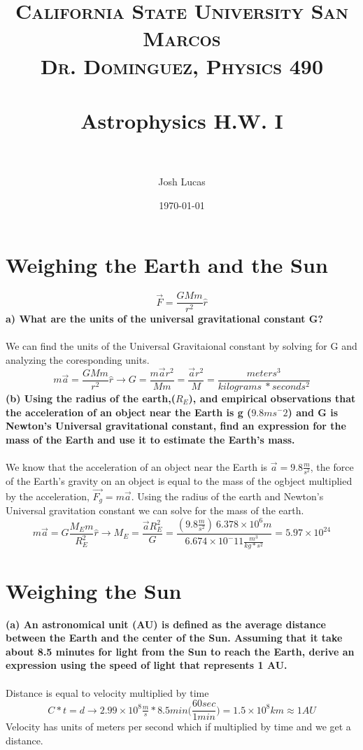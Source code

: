 \documentclass[paper=a4, fontsize=11pt]{scrartcl} %
\title{	
\normalfont \normalsize 
\textsc{California State University San Marcos \\ Dr. Dominguez, Physics 490} \\ [25pt] %
\horrule{0.5pt} \\[0.4cm] %
\huge Astrophysics H.W. I \\ %
\horrule{2pt} \\[0.5cm] %
}
\author{Josh Lucas} %
\date{\normalsize\today} %
\numberwithin{equation}{section} %
\numberwithin{figure}{section} %
\numberwithin{table}{section} %
\begin{document}
\maketitle %


\section{Weighing the Earth and the Sun}
\begin{equation}
\vec{F}= \frac{GMm}{r^2}\hat{r}
\end{equation}
\textbf{a) What are the units of the universal gravitational constant G?}\\
\\
We can find the units of the Universal Gravitaional constant by solving for G and analyzing the coresponding units.
\begin{equation*}
m\vec{a} = \frac{GMm}{r^2}\hat{r} \rightarrow G = \frac{m\vec{a} r^2}{Mm} = \frac{\vec{a}r^2}{M} = \frac{meters^3}{kilograms\ * seconds^2}
\end{equation*}
\textbf{(b) Using the radius of the earth,($R_E$), and empirical observations that the acceleration of an object near the Earth is g ($9.8ms^-2$)  and G is Newton's  Universal gravitational constant, find an expression for the mass of the Earth and use it to estimate the Earth's mass.}\\
\\
We know that the acceleration of an object near the Earth is $\vec{a} = 9.8\tfrac{m}{s^2}$, the force of the Earth's gravity on an object is equal to the mass of the ogbject multiplied by the acceleration,  $ \vec{F_g} = m\vec{a}$. Using the radius of the earth and Newton's Universal gravitation constant we can solve for the mass of the earth.
\begin{equation*}
m\vec{a} = G\frac{M_E m}{R_E^2}\hat{r} \rightarrow M_E = \frac{\vec{a}R_E^2}{G} = \frac{(9.8\tfrac{m}{s^2})\ 6.378\times 10^6m}{6.674\times 10^-11 \tfrac{m^3}{kg*s^2}} = 5.97\times 10^{24}
\end{equation*}
\section{Weighing the Sun}

\textbf{(a) An astronomical unit (AU) is defined as the average distance between the Earth and the
center of the Sun. Assuming that it take about 8.5 minutes for light from the Sun to reach the
Earth, derive an expression using the speed of light that represents 1 AU.}\\
\\
Distance is equal to velocity multiplied by time
\begin{equation*}
C * t = d \rightarrow 2.99\times 10^8 \tfrac{m}{s} * 8.5min \big(\frac{60sec}{1min}\big) = 1.5\times 10^8 km\approx1 AU
\end{equation*}
Velocity has units of meters per second which if multiplied by time and we get a distance. 
\end{document}

